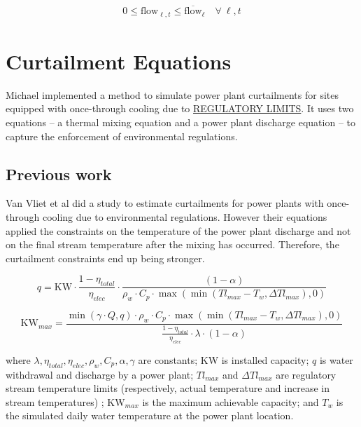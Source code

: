 \documentclass[11pt, oneside]{article}   	%
\newcommand{\flow}{\text{flow}}
\begin{document}
\begin{equation} \label{eq:trans}
\begin{split}
0 \le \flow_{\ell, t} \le   \overline{\flow}_{\ell} \quad \forall~\ell, t
\end{split}
\end{equation}


\newpage
\section{Curtailment Equations}

Michael implemented a method to simulate power plant curtailments for sites equipped with once-through cooling due to \underline{REGULATORY LIMITS}. It uses two equations --  a thermal mixing equation and a power plant discharge equation -- to capture the enforcement of environmental regulations.

\subsection{Previous work}

Van Vliet et al did a study to estimate curtailments for power plants with once-through cooling due to environmental regulations. However their equations applied the constraints on the temperature of the power plant discharge and not on the final stream temperature after the mixing has occurred. Therefore, the curtailment constraints end up being stronger. 

\begin{equation}
q = \text{KW}\cdot\frac{1-\eta_{total}}{\eta_{elec}}\cdot\frac{(1-\alpha)}{\rho_w\cdot C_p\cdot\max{(\min{(Tl_{max} - T_w, \Delta Tl_{max})}, 0)}}
\end{equation}

\begin{equation}
\text{KW}_{max} = \frac{\min{(\gamma\cdot Q, q)} \cdot \rho_w\cdot C_p\cdot\max{(\min{(Tl_{max} - T_w, \Delta Tl_{max})}, 0)}}{\frac{1-\eta_{total}}{\eta_{elec}}\cdot \lambda \cdot(1-\alpha)}
\end{equation}

where $\lambda, \eta_{total}, \eta_{elec}, \rho_w, C_p, \alpha, \gamma$ are constants; KW is installed capacity; $q$ is water withdrawal and discharge by a power plant; $Tl_{max}$ and $ \Delta Tl_{max}$ are regulatory stream temperature limits (respectively, actual temperature and increase in stream temperatures) ; $\text{KW}_{max}$ is the maximum achievable capacity; and $T_w$ is the simulated daily water temperature at the power plant location. 
\end{document}
